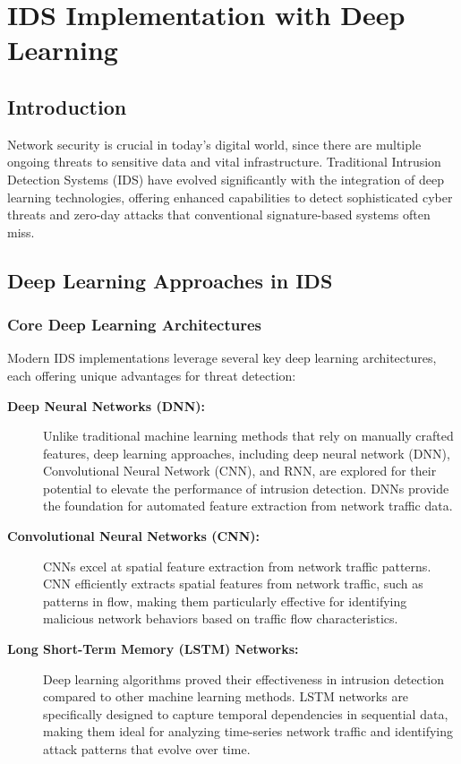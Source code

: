 \documentclass[16pt]{report}
\begin{document}
\section{IDS Implementation with Deep Learning}

\subsection{Introduction}

Network security is crucial in today's digital world, since there are multiple ongoing threats to sensitive data and vital infrastructure. Traditional Intrusion Detection Systems (IDS) have evolved significantly with the integration of deep learning technologies, offering enhanced capabilities to detect sophisticated cyber threats and zero-day attacks that conventional signature-based systems often miss.

\subsection{Deep Learning Approaches in IDS}

\subsubsection{Core Deep Learning Architectures}
Modern IDS implementations leverage several key deep learning architectures, each offering unique advantages for threat detection:

\begin{description}
    \item[\textbf{Deep Neural Networks (DNN):}] Unlike traditional machine learning methods that rely on manually crafted features, deep learning approaches, including deep neural network (DNN), Convolutional Neural Network (CNN), and RNN, are explored for their potential to elevate the performance of intrusion detection. DNNs provide the foundation for automated feature extraction from network traffic data.

    \item[\textbf{Convolutional Neural Networks (CNN):}] CNNs excel at spatial feature extraction from network traffic patterns. CNN efficiently extracts spatial features from network traffic, such as patterns in flow, making them particularly effective for identifying malicious network behaviors based on traffic flow characteristics.

    \item[\textbf{Long Short-Term Memory (LSTM) Networks:}] Deep learning algorithms proved their effectiveness in intrusion detection compared to other machine learning methods. LSTM networks are specifically designed to capture temporal dependencies in sequential data, making them ideal for analyzing time-series network traffic and identifying attack patterns that evolve over time.
\end{description}
\end{document}
